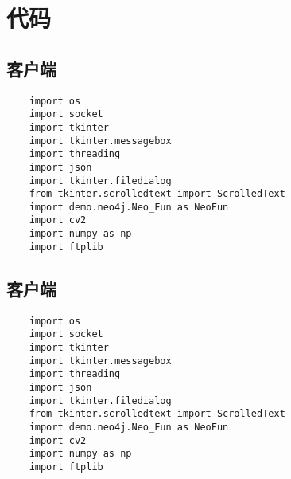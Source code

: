 \documentclass[forprint]{OSPaper}
\begin{document}

\appendix


\chapter{代码}

\section{客户端}

\begin{lstlisting}
	import os
	import socket
	import tkinter
	import tkinter.messagebox
	import threading
	import json
	import tkinter.filedialog
	from tkinter.scrolledtext import ScrolledText
	import demo.neo4j.Neo_Fun as NeoFun
	import cv2
	import numpy as np
	import ftplib
\end{lstlisting}

\section{客户端}
\begin{lstlisting}
	import os
	import socket
	import tkinter
	import tkinter.messagebox
	import threading
	import json
	import tkinter.filedialog
	from tkinter.scrolledtext import ScrolledText
	import demo.neo4j.Neo_Fun as NeoFun
	import cv2
	import numpy as np
	import ftplib
\end{lstlisting}
\end{document}
